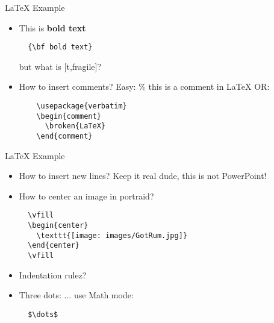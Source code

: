 
\begin{frame}[t,plain]
  \titlepage
\end{frame}

\begin{frame}[t,fragile]{LaTeX Example}
\begin{itemize}
  \item This is {\bf bold text}
  \begin{lstlisting}
  {\bf bold text}
  \end{lstlisting}
but what is [t,fragile]?
  \item How to insert comments?
  Easy: \% this is a comment in LaTeX
  OR:
  \begin{lstlisting}
    \usepackage{verbatim}
    \begin{comment}
      \broken{LaTeX}
    \end{comment}
  \end{lstlisting}
  \end{itemize}
\end{frame}

\begin{frame}[t,fragile]{LaTeX Example}  
\begin{itemize}
  \item How to insert new lines?
  Keep it real dude, this is not PowerPoint!
  \item How to center an image in portraid?
  \begin{lstlisting}
  \vfill
  \begin{center}
    \texttt{[image: images/GotRum.jpg]}
  \end{center}
  \vfill
  \end{lstlisting}
  \item Indentation rulez?
  \item Three dots: $\dots$
  use Math mode: 
  \begin{lstlisting}
  $\dots$
  \end{lstlisting}
\end{itemize}
\end{frame}
